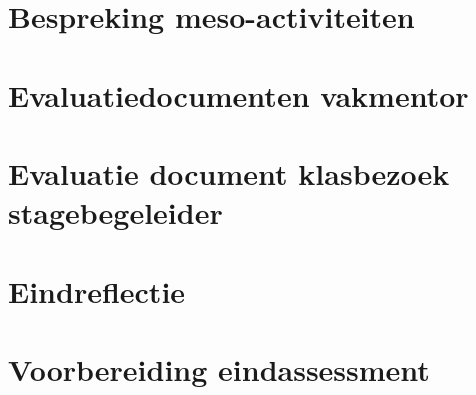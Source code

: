 \documentclass[a4paper,12pt,twoside]{article}%
\begin{document}
\section{Bespreking meso-activiteiten}

\section{Evaluatiedocumenten vakmentor}

\section{Evaluatie document klasbezoek stagebegeleider}

\section{Eindreflectie}

\section{Voorbereiding eindassessment}


















 
\end{document}
